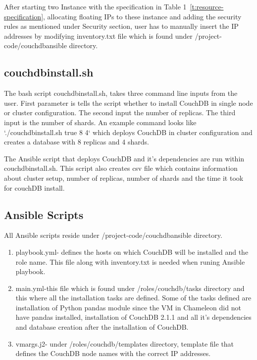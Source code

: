 After starting two Instance  with the specification in Table
1~\ref{t:resource-specification}, allocating floating IPs to these 
instance and adding the security rules as mentioned under Security
section, user has to manually insert the IP addresses by modifying
inventory.txt file which is found under /project-code/couchdbansible
directory. 

\subsection{couchdbinstall.sh}

The bash script couchdbinstall.sh, takes three command line inputs
from the user. First parameter is tells the script whether to install
CouchDB in single node or cluster configuration. The second input the
number of replicas. The third input is the number of shards. An
example command looks like `./couchdbinstall.sh true 8 4` which
deploys CouchDB in cluster configuration and creates a database with 8
replicas and 4 shards.

The Ansible script that deploys CouchDB and it's dependencies are run
within couchdbinstall.sh. This script also creates csv file which
contains information about cluster setup, number of replicas, number
of shards and the time it took for couchDB install.

\subsection{Ansible Scripts}
All Ansible scripts reside under /project-code/couchdbansible
directory. 
\begin{enumerate}
  \item playbook.yml- defines the hosts on which CouchDB will be
    installed and the role name. This file along with inventory.txt is
    needed when runing Ansible playbook.

  \item main.yml-this file which is found under /roles/couchdb/tasks
    directory and this where all the installation tasks are
    defined. Some of the tasks defined are installation of Python
    pandas module since the VM in Chameleon did not have pandas
    installed, installation of CouchDB 2.1.1 and all it's dependencies
    and database creation after the installation of CouchDB.

  \item vmargs.j2- under /roles/couchdb/templates directory, template
    file that defines the CouchDB node names with the correct IP addresses.
\end{enumerate}

